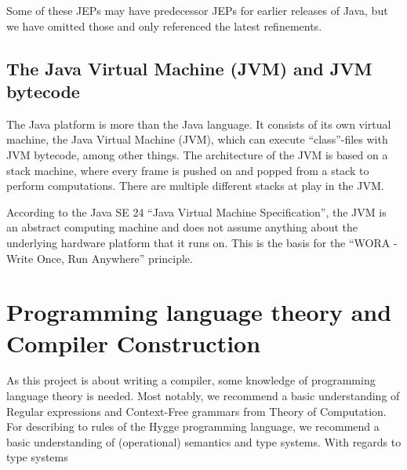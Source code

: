 Some of these JEPs may have predecessor JEPs for earlier releases of Java, but we have omitted those and only referenced the latest refinements. 

\subsection{The Java Virtual Machine (JVM) and JVM bytecode}

The Java platform is more than the Java language. It consists of its own virtual machine,
the Java Virtual Machine (JVM), which can execute ``class''-files with JVM bytecode, among other things.
The architecture of the JVM is based on a stack machine, where every frame is pushed on and popped from
a stack to perform computations. There are multiple different stacks at play in the JVM.

According to the Java SE 24 ``Java Virtual Machine Specification'', the JVM is an abstract computing machine
and does not assume anything about the underlying hardware platform that it runs on. This is the basis for the
``WORA - Write Once, Run Anywhere'' principle.

\section{Programming language theory and Compiler Construction}

As this project is about writing a compiler, some knowledge of programming language theory is needed. Most notably, we
recommend a basic understanding of Regular expressions and Context-Free grammars from Theory of Computation.
For describing to rules of the Hygge programming language, we recommend a basic understanding of (operational) semantics
and type systems. With regards to type systems 